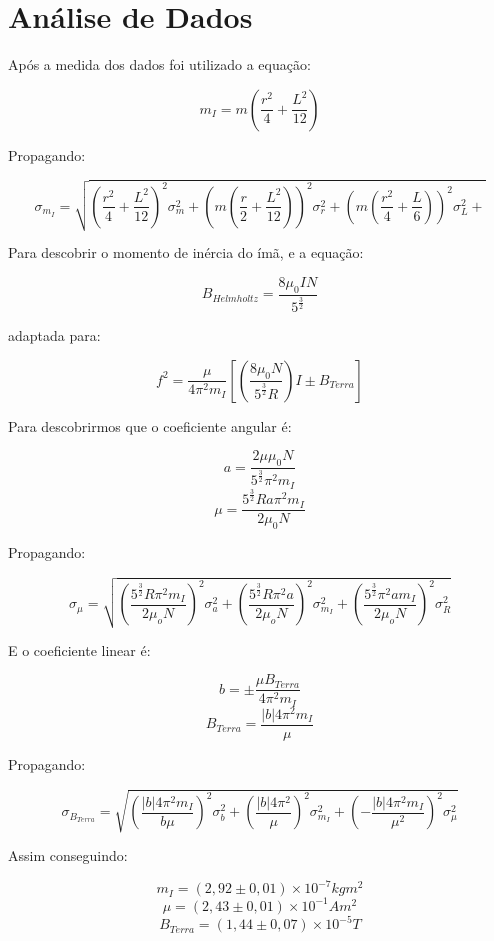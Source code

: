\section{Análise de Dados}
    Após a medida dos dados foi utilizado a equação:

    $$m_I = m (\frac{r^2}{4} + \frac{L^2}{12})$$

    Propagando:

    $$\sigma_{m_I} = \sqrt{
        (\frac{r^2}{4} + \frac{L^2}{12})^2 \sigma_m^2 + 
        (m (\frac{r}{2} + \frac{L^2}{12}))^2 \sigma_r^2 + 
        (m (\frac{r^2}{4} + \frac{L}{6}))^2 \sigma_L^2 + 
    }$$


    Para descobrir o momento de inércia do ímã,
    e a equação:

    $$B_{Helmholtz} = 
    \frac{8\mu_0 I N}{5^{\frac{3}{2}}}$$

    adaptada para:

    $$f^2 = \frac{\mu}{4 \pi^2 m_I} 
    [(\frac{8\mu_0 N}{5^{\frac{3}{2}} R}) I \pm B_{Terra}]$$
    
    Para descobrirmos que o coeficiente angular é:

    $$a = \frac{2 \mu \mu_0 N}{5^{\frac{3}{2}}\pi^2 m_I} $$
    $$\mu = \frac{5^{\frac{3}{2}} R a \pi^2 m_I}{2 \mu_0 N} $$
    
    Propagando:

    $$\sigma_\mu = \sqrt{
        (\frac{5^{\frac{3}{2}} R \pi^2 m_I}{2 \mu_o N})^2 \sigma_a^2 + 
        (\frac{5^{\frac{3}{2}} R \pi^2 a}{2 \mu_o N})^2 \sigma_{m_I}^2 + 
        (\frac{5^{\frac{3}{2}}\pi^2 a m_I}{2 \mu_o N})^2 \sigma_{R}^2
    }$$

    E o coeficiente linear é:

    $$b = \pm \frac{\mu B_{Terra}}{4 \pi^2 m_I}$$
    $$B_{Terra} = \frac{|b| 4 \pi^2 m_I}{\mu}$$

    Propagando:

    $$\sigma_{B_{Terra}} = \sqrt{
        (\frac{|b| 4 \pi^2 m_I}{b \mu})^2 \sigma_b^2 +
        (\frac{|b| 4 \pi^2}{\mu})^2 \sigma_{m_I}^2 +
        (-\frac{|b| 4 \pi^2 m_I}{\mu^2})^2 \sigma_\mu^2
    }$$

    Assim conseguindo:

    $$m_I = (2,92 \pm 0,01) \times 10^{-7} kg m^2$$
    $$\mu = (2,43 \pm 0,01) \times 10^{-1} A m^2$$
    $$B_{Terra} = (1,44 \pm 0,07) \times 10^{-5} T$$